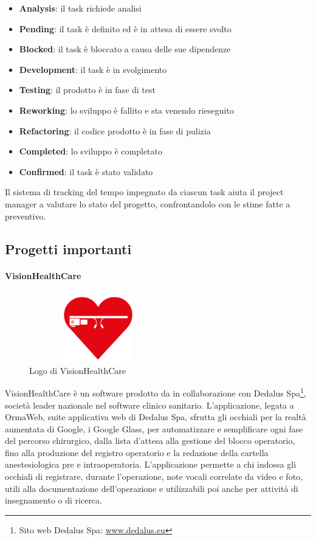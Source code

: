    \begin{itemize}
      \item{\textbf{Analysis}: il task richiede analisi}
      \item{\textbf{Pending}: il task è definito ed è in attesa di essere svolto}
      \item{\textbf{Blocked}: il task è bloccato a causa delle sue dipendenze}
      \item{\textbf{Development}: il task è in svolgimento}
      \item{\textbf{Testing}: il prodotto è in fase di test}
      \item{\textbf{Reworking}: lo sviluppo è fallito e sta venendo rieseguito}
      \item{\textbf{Refactoring}: il codice prodotto è in fase di pulizia}
      \item{\textbf{Completed}: lo sviluppo è completato}
      \item{\textbf{Confirmed}: il task è stato validato}
   \end{itemize}
   Il sistema di tracking del tempo impegnato da ciascun task aiuta il project manager a valutare lo stato del progetto, confrontandolo con le stime fatte a preventivo.

   \subsection{Progetti importanti}
   \paragraph{VisionHealthCare}
   \begin{figure}[H]
      \begin{center}
         \includegraphics[width=6cm,height=3cm,keepaspectratio]{immagini/visionhealthcare-logo}
      \end{center}
      \caption{Logo di VisionHealthCare}\label{logovisionhealthcare}
   \end{figure}
   VisionHealthCare è un software prodotto da \nomeAzienda{} in collaborazione con Dedalus Spa\footnote{Sito web Dedalus Spa: \href{www.dedalus.eu}{www.dedalus.eu}}, società leader nazionale nel software clinico sanitario. L'applicazione, legata a OrmaWeb, suite applicativa web di Dedalus Spa, sfrutta gli occhiali per la realtà aumentata di Google, i Google Glass, per automatizzare e semplificare ogni fase del percorso chirurgico, dalla lista d'attesa alla gestione del blocco operatorio, fino alla produzione del registro operatorio e la redazione della cartella anestesiologica pre e intraoperatoria. L'applicazione permette a chi indossa gli occhiali di registrare, durante l'operazione, note vocali correlate da video e foto, utili alla documentazione dell'operazione e utilizzabili poi anche per attività di insegnamento o di ricerca.

